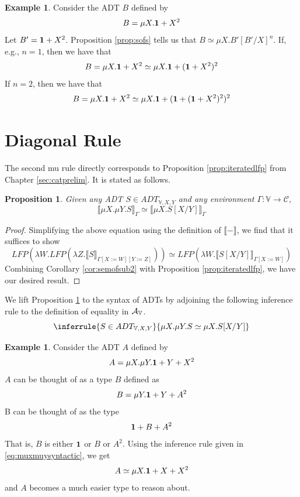 \documentclass{msthesis}
\newtheorem{prop}[theorem]{Proposition}
\theoremstyle{definition}
\newtheorem{example}[theorem]{Example}
\newcommand{\semof}[1]{\llbracket{#1}\rrbracket}
\newcommand{\mcC}{\mathcal{C}}
\newcommand{\vars}{\mathbb{V}}
\begin{document}
\begin{example}
    Consider the ADT $B$ defined by
    \[ B = \mu X.\mathbf{1} + X^2 \]
    Let $B' = \mathbf{1} + X^2$.
    Proposition \ref{prop:sofs} tells us that $B \simeq \mu X.B'[B'/X]^n$.  If, e.g., $n = 1$, then we have that
    \[ B = \mu X. \mathbf{1} + X^2 \simeq \mu X.\mathbf{1} + (\mathbf{1} + X^2)^2\]
    If $n = 2$, then we have that
    \[ B = \mu X. \mathbf{1} + X^2 \simeq \mu X.\mathbf{1} + (\mathbf{1} + (\mathbf{1} + X^2)^2)^2\] 
\end{example}

\section{Diagonal Rule}

The second mu rule directly corresponds to Proposition \ref{prop:iteratedlfp} from Chapter \ref{sec:catprelim}.  It is stated as follows.

\begin{prop}\label{prop:muxmuy}
    Given any ADT $S \in ADT_{\vars, X, Y}$ and any environment $\Gamma : \vars \to \mcC$,
    \[ \semof{\mu X.\mu Y.S}_{\Gamma} \simeq \semof{\mu X. S[X/Y]}_\Gamma \]
\end{prop}
\begin{proof}
    Simplifying the above equation using the definition of $\semof{-}$, we find that it suffices to show
    \begin{equation*}\label{eq:muxmuy1}
        LFP(\lambda W.LFP(\lambda Z.\semof{S}_{\Gamma[X:=W][Y:=Z]})) \simeq LFP(\lambda W.\semof{S[X/Y]}_{\Gamma[X:=W]})
    \end{equation*}
    Combining Corollary \ref{cor:semofsub2} with Proposition \ref{prop:iteratedlfp}, we have our desired result. \qedhere
\end{proof}

We lift Proposition \ref{prop:muxmuy} to the syntax of ADTs by adjoining the following inference rule to the definition of equality in $\ADTrig$.
\begin{equation}\label{eq:muxmuysyntactic}
    \inferrule{S \in ADT_{\vars, X, Y}}{\mu X.\mu Y.S \simeq \mu X.S[X/Y]}
\end{equation}

\begin{example}
Consider the ADT $A$ defined by
\[ A = \mu X. \mu Y. \mathbf{1} + Y + X^2 \]
$A$ can be thought of as a type $B$ defined as
\[ B = \mu Y. \mathbf{1} + Y + A^2 \]
B can be thought of as the type
\[ \mathbf{1} + B + A^2 \]
That is, $B$ is either $\mathbf{1}$ or $B$ or $A^2$.
Using the inference rule given in \eqref{eq:muxmuysyntactic}, we get
\[ A \simeq \mu X. \mathbf{1} + X + X^2 \]
and $A$ becomes a much easier type to reason about.
\end{example}
\end{document}
